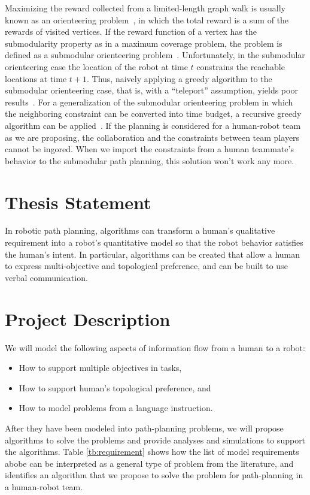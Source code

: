 \documentclass[phd]{byuprop}
\begin{document}
Maximizing the reward collected from a limited-length graph walk is usually known as an orienteering problem~\cite{Vansteenwegen2011}, in which the total reward is a sum of the rewards of visited vertices. 
If the reward function of a vertex has the submodularity property as in a maximum coverage problem, the problem is defined as a submodular orienteering problem~\cite{Chekuri2005}. 
Unfortunately, in the submodular orienteering case the location of the robot at time $ t $ constrains the reachable locations at time $ t+1 $.
Thus, naively applying a greedy algorithm to the submodular orienteering case, that is, with a “teleport” assumption, yields poor results~\cite{Krause2012}. 
For a generalization of the submodular orienteering problem in which the neighboring constraint can be converted into time budget, a recursive greedy algorithm can be applied~\cite{Chekuri2005}.
If the planning is considered for a human-robot team as we are proposing, the collaboration and the constraints between team players cannot be ingored.
When we import the constraints from a human teammate's behavior to the submodular path planning, this solution won't work any more. 


\section{Thesis Statement}
\label{sec:thesis_statement}

In robotic path planning, algorithms can transform a human's qualitative requirement into a robot's quantitative model so that the robot behavior satisfies the human's intent.
In particular, algorithms can be created that allow a human to express multi-objective and topological preference, and can be built to use verbal communication.

\section{Project Description}
\label{sec:project_description}

We will model the following aspects of information flow from a human to a robot: 
\begin{itemize}
	\item How to support multiple objectives in tasks,
	\item How to support human's topological preference, and
	\item How to model problems from a language instruction.
\end{itemize}
After they have been modeled into path-planning problems, we will propose algorithms to solve the problems and provide analyses and simulations to support the algorithms.
Table \ref{tb:requirement} shows how the list of model requirements abobe can be interpreted as a general type of problem from the literature, and identifies an algorithm that we propose to solve the problem for path-planning in a human-robot team.
\end{document}
